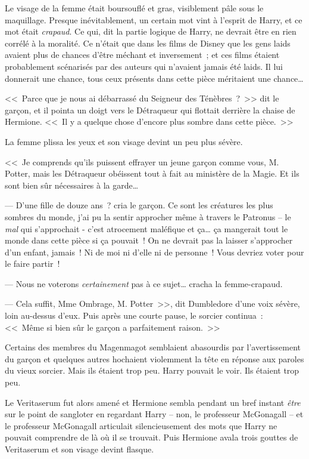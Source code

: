 Le visage de la femme était boursouflé et gras, visiblement pâle sous le maquillage. Presque inévitablement, un certain mot vint à l'esprit de Harry, et ce mot était \emph{crapaud}. Ce qui, dit la partie logique de Harry, ne devrait être en rien corrélé à la moralité. Ce n'était que dans les films de Disney que les gens laids avaient plus de chances d'être méchant et inversement~; et ces films étaient probablement scénarisés par des auteurs qui n'avaient jamais été laids. Il lui donnerait une chance, tous ceux présents dans cette pièce méritaient une chance…

<<~Parce que je nous ai débarrassé du Seigneur des Ténèbres~?~>> dit le garçon, et il pointa un doigt vers le Détraqueur qui flottait derrière la chaise de Hermione. <<~Il y a quelque chose d'encore plus sombre dans cette pièce.~>>

La femme plissa les yeux et son visage devint un peu plus sévère.

<<~Je comprends qu'ils puissent effrayer un jeune garçon comme vous, M. Potter, mais les Détraqueur obéissent tout à fait au ministère de la Magie. Et ils sont bien sûr nécessaires à la garde…

--- D'une fille de douze ans~? cria le garçon. Ce sont les créatures les plus sombres du monde, j'ai pu la sentir approcher même à travers le Patronus -- le \emph{mal} qui s'approchait - c'est atrocement maléfique et ça… ça mangerait tout le monde dans cette pièce si ça pouvait~! On ne devrait pas la laisser s'approcher d'un enfant, jamais~! Ni de moi ni d'elle ni de personne~! Vous devriez voter pour le faire partir~!

--- Nous ne voterons \emph{certainement} pas à ce sujet… cracha la femme-crapaud.

--- Cela suffit, Mme Ombrage, M. Potter~>>, dit Dumbledore d'une voix sévère, loin au-dessus d'eux. Puis après une courte pause, le sorcier continua~: <<~Même si bien sûr le garçon a parfaitement raison.~>>

Certains des membres du Magenmagot semblaient abasourdis par l'avertissement du garçon et quelques autres hochaient violemment la tête en réponse aux paroles du vieux sorcier. Mais ils étaient trop peu. Harry pouvait le voir. Ils étaient trop peu.

Le Veritaserum fut alors amené et Hermione sembla pendant un bref instant \emph{être} sur le point de sangloter en regardant Harry -- non, le professeur McGonagall -- et le professeur McGonagall articulait silencieusement des mots que Harry ne pouvait comprendre de là où il se trouvait. Puis Hermione avala trois gouttes de Veritaserum et son visage devint flasque.

